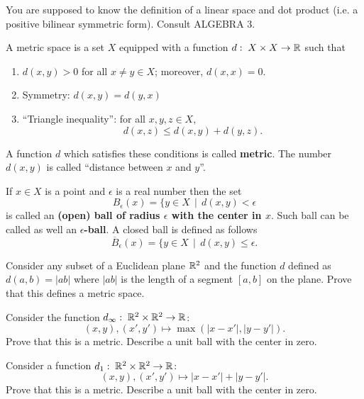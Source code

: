 \documentclass[12pt]{article}
\begin{document}


You are supposed to know the definition of a linear space and dot
product (i.e. a positive bilinear symmetric form). Consult ALGEBRA 3.


\begin{opredelenie} A metric space is a set $X$ equipped with a
  function $d:\; X \times X \to {\mathbb R}$ such that
\begin{enumerate}
\item 
$d(x,y)> 0$ for all $x\neq y \in X$;  moreover, $d(x,x)=0$.

\item Symmetry: $d(x, y) = d (y, x)$

\item ``Triangle inequality'': for all $x, y, z \in X$,
$$
d(x,z) \leq  d(x,y) + d(y,z).
$$
\end{enumerate}
A function $d$ which satisfies these conditions is called {\bf
  metric}. The number $d(x,y)$ is called  ``distance between $x$ and
$y$''.
\end{opredelenie}

If $x\in X$ is a point and $\epsilon$ is a real number
then the set
$$ 
B_\epsilon(x) = \{ y \in X \ \  | \ \  d(x,y)< \epsilon
$$
is called an {\bf (open) ball of radius $\epsilon$ with the center in $x$}.
Such ball can be called as well an {\bf $\epsilon$-ball}. A closed
ball is defined as follows
$$ 
\overline B_\epsilon(x) = \{ y \in X \ \  | \ \  d(x,y)\leq \epsilon.
$$

\begin{zadacha} Consider any subset of a Euclidean plane
${\mathbb R}^2$ and the function $d$ defined as $d(a, b)= |ab|$ where $|ab|$ is
the length of a segment $[a, b]$ on the plane. Prove that this defines
a metric space.
\end{zadacha}

\begin{zadacha} Consider the function  $d_\infty:\;{\mathbb R}^2\times {\mathbb R}^2
\to {\mathbb R}$:
$$
(x, y), (x', y') \mapsto \max (|x-x'|, |y-y'|).
$$
Prove that this is a metric. Describe a unit ball with the center in zero.
\end{zadacha}

\begin{zadacha} Consider a function $d_1:\;{\mathbb R}^2\times {\mathbb R}^2 \to {\mathbb R}$:
$$
(x, y), (x', y') \mapsto |x-x'|+ |y-y'|.
$$
Prove that this is a metric. Describe a unit ball with the center in zero.
\end{zadacha}
\end{document}
